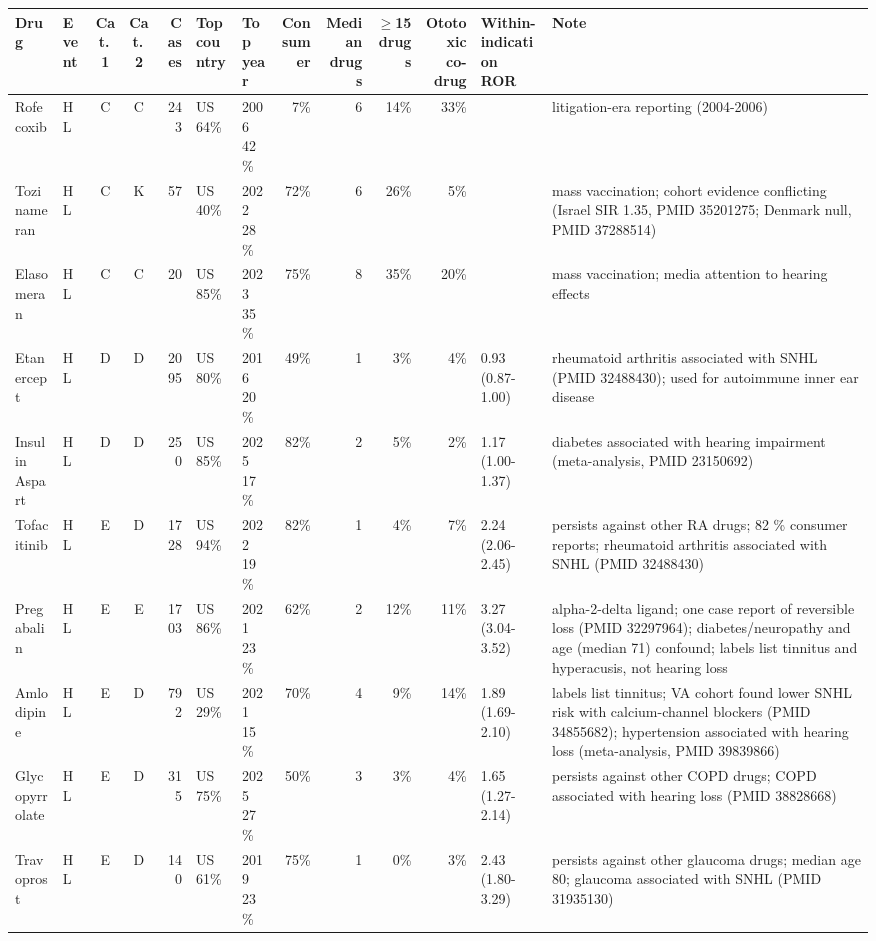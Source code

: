 \documentclass[10pt]{article}
\begin{document}
{\footnotesize
\begin{longtable}{p{2.2cm}lccrllrrrrp{2.2cm}p{4.6cm}}
\toprule
Drug & Event & Cat.\,1 & Cat.\,2 & Cases & Top country & Top year & Consumer & Median drugs & $\geq$15 drugs & Ototoxic co-drug & Within-indication ROR & Note \\
\midrule
Rofecoxib & HL & C & C & 243 & US 64\% & 2006 42\% & 7\% & 6 & 14\% & 33\% &  & litigation-era reporting (2004-2006) \\
Tozinameran & HL & C & K & 57 & US 40\% & 2022 28\% & 72\% & 6 & 26\% & 5\% &  & mass vaccination; cohort evidence conflicting (Israel SIR 1.35, PMID 35201275; Denmark null, PMID 37288514) \\
Elasomeran & HL & C & C & 20 & US 85\% & 2023 35\% & 75\% & 8 & 35\% & 20\% &  & mass vaccination; media attention to hearing effects \\
Etanercept & HL & D & D & 2095 & US 80\% & 2016 20\% & 49\% & 1 & 3\% & 4\% & 0.93 (0.87-1.00) & rheumatoid arthritis associated with SNHL (PMID 32488430); used for autoimmune inner ear disease \\
Insulin Aspart & HL & D & D & 250 & US 85\% & 2025 17\% & 82\% & 2 & 5\% & 2\% & 1.17 (1.00-1.37) & diabetes associated with hearing impairment (meta-analysis, PMID 23150692) \\
Tofacitinib & HL & E & D & 1728 & US 94\% & 2022 19\% & 82\% & 1 & 4\% & 7\% & 2.24 (2.06-2.45) & persists against other RA drugs; 82 \% consumer reports; rheumatoid arthritis associated with SNHL (PMID 32488430) \\
Pregabalin & HL & E & E & 1703 & US 86\% & 2021 23\% & 62\% & 2 & 12\% & 11\% & 3.27 (3.04-3.52) & alpha-2-delta ligand; one case report of reversible loss (PMID 32297964); diabetes/neuropathy and age (median 71) confound; labels list tinnitus and hyperacusis, not hearing loss \\
Amlodipine & HL & E & D & 792 & US 29\% & 2021 15\% & 70\% & 4 & 9\% & 14\% & 1.89 (1.69-2.10) & labels list tinnitus; VA cohort found lower SNHL risk with calcium-channel blockers (PMID 34855682); hypertension associated with hearing loss (meta-analysis, PMID 39839866) \\
Glycopyrrolate & HL & E & D & 315 & US 75\% & 2025 27\% & 50\% & 3 & 3\% & 4\% & 1.65 (1.27-2.14) & persists against other COPD drugs; COPD associated with hearing loss (PMID 38828668) \\
Travoprost & HL & E & D & 140 & US 61\% & 2019 23\% & 75\% & 1 & 0\% & 3\% & 2.43 (1.80-3.29) & persists against other glaucoma drugs; median age 80; glaucoma associated with SNHL (PMID 31935130) \\

\end{longtable}}
\end{document}
